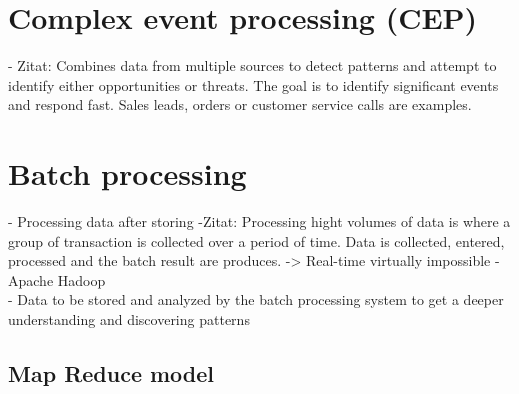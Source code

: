 \section{Complex event processing (CEP)}
- Zitat: Combines data from multiple sources  to detect patterns and attempt to
identify either opportunities or threats. The goal is to identify significant
events and respond fast. Sales leads, orders or customer service calls are
examples.\\

\section{Batch processing}
- Processing data after storing 
-Zitat: Processing hight volumes of data is where a group of transaction is collected
over a period of time. Data is collected, entered, processed and the batch
result are produces. -> Real-time virtually impossible
- Apache Hadoop\\
- Data to be stored and analyzed by the batch processing system to get a deeper
understanding and discovering patterns
\subsection{Map Reduce model }

